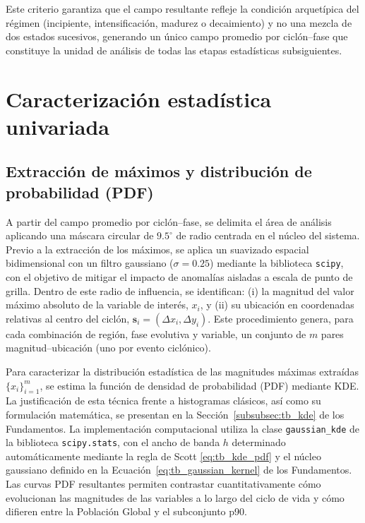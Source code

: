 Este criterio garantiza que el campo resultante refleje la condición arquetípica del régimen (incipiente, intensificación, madurez o decaimiento) y no una mezcla de dos estados sucesivos, generando un único campo promedio por ciclón--fase que constituye la unidad de análisis de todas las etapas estadísticas subsiguientes.


\section{Caracterización estadística univariada}\label{sec:tecnicas_estadisticas}

\subsection{Extracción de máximos y distribución de probabilidad (PDF)}\label{subsec:extraccion_pdf}

A partir del campo promedio por ciclón--fase, se delimita el área de análisis aplicando una máscara circular de $9.5^{\circ}$ de radio centrada en el núcleo del sistema. Previo a la extracción de los máximos, se aplica un suavizado espacial bidimensional con un filtro gaussiano ($\sigma = 0.25$) mediante la biblioteca \texttt{scipy}, con el objetivo de mitigar el impacto de anomalías aisladas a escala de punto de grilla. Dentro de este radio de influencia, se identifican: (i) la magnitud del valor máximo absoluto de la variable de interés, $x_i$, y (ii) su ubicación en coordenadas relativas al centro del ciclón, $\mathbf{s}_i = (\Delta x_i, \Delta y_i)$. Este procedimiento genera, para cada combinación de región, fase evolutiva y variable, un conjunto de $m$ pares magnitud--ubicación (uno por evento ciclónico).

Para caracterizar la distribución estadística de las magnitudes máximas extraídas $\{x_i\}_{i=1}^{m}$, se estima la función de densidad de probabilidad (PDF) mediante KDE. La justificación de esta técnica frente a histogramas clásicos, así como su formulación matemática, se presentan en la Sección~\ref{subsubsec:tb_kde} de los Fundamentos. La implementación computacional utiliza la clase \texttt{gaussian\_kde} de la biblioteca \texttt{scipy.stats}, con el ancho de banda $h$ determinado automáticamente mediante la regla de Scott \ref{eq:tb_kde_pdf} y el núcleo gaussiano definido en la Ecuación~\ref{eq:tb_gaussian_kernel} de los Fundamentos. Las curvas PDF resultantes permiten contrastar cuantitativamente cómo evolucionan las magnitudes de las variables a lo largo del ciclo de vida y cómo difieren entre la Población Global y el subconjunto p90.

